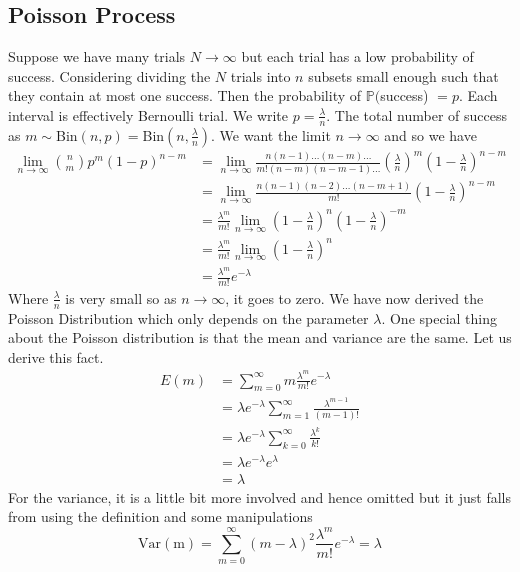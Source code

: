 \documentclass{article}
\newcommand{\p}{\mathbb{P}}
\begin{document}
\subsection{Poisson Process}
Suppose we have many trials $N\to \infty$ but each trial has a low probability of success. Considering dividing the $N$ trials into $n$ subsets small enough such that they contain at most one success. Then the probability of $\p($success) $=p$. Each interval is effectively Bernoulli trial. We write $p=\frac{\lambda}{n}$. The total number of success as $m\sim $Bin$(n,p)=$Bin$(n,\frac{\lambda}{n})$. We want the limit $n\to \infty$ and so we have 
\begin{equation*}
    \begin{split}
        \lim_{n\to \infty} \binom{n}{m} p^m (1-p)^{n-m} &= \lim_{n\to \infty} \frac{n(n-1)\ldots (n-m)\ldots}{m!(n-m)(n-m-1)\ldots} \left( \frac{\lambda}{n} \right)^m \left(1-\frac{\lambda}{n} \right)^{n-m} \\
        &= \lim_{n\to \infty} \frac{n(n-1)(n-2)\ldots(n-m+1)}{m!}\left(1-\frac{\lambda}{n} \right)^{n-m} \\
        &= \frac{\lambda^m}{m!}\lim_{n\to \infty}\left(1-\frac{\lambda}{n} \right)^n\left(1-\frac{\lambda}{n}\right)^{-m} \\
        &= \frac{\lambda^m}{m!}\lim_{n\to \infty}\left(1-\frac{\lambda}{n}\right)^n \\
        &= \frac{\lambda^m}{m!}e^{-\lambda}
    \end{split}
\end{equation*}
Where $\frac{\lambda}{n}$ is very small so as $n\to \infty$, it goes to zero. We have now derived the Poisson Distribution which only depends on the parameter $\lambda$. One special thing about the Poisson distribution is that the mean and variance are the same. Let us derive this fact.
\begin{equation*}
    \begin{split}
        E(m) &= \sum^\infty_{m=0} m\frac{\lambda^m}{m!} e^{-\lambda} \\
        &= \lambda e^{-\lambda} \sum^\infty_{m=1} \frac{\lambda^{m-1}}{(m-1)!} \\
        &= \lambda e^{-\lambda}\sum^\infty_{k=0} \frac{\lambda^k}{k!} \\
        &= \lambda e^{-\lambda}e^{\lambda} \\
        &= \lambda
    \end{split}
\end{equation*}
For the variance, it is a little bit more involved and hence omitted but it just falls from using the definition and some manipulations
\begin{equation*}
    \operatorname{Var(m)} = \sum^\infty_{m=0} (m-\lambda)^2 \frac{\lambda^m}{m!} e^{-\lambda} =\lambda
\end{equation*}
\end{document}
